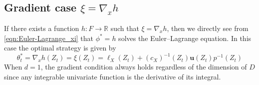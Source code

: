 \documentclass{article}
\theoremstyle{plain}
\theoremstyle{definition}
\newcommand{\R}{\mathbb{R}}
\numberwithin{lem}{section}
\begin{document}
\subsection{Gradient case \texorpdfstring{$\xi = \nabla_x h$}{}} \label{sec:gradient}
If there exists a function $h: F \to \R$ such that $\xi =\nabla_x h$, then we directly see from \eqref{eqn:Euler-Lagrange_xi} that $\phi^* = h$ solves the Euler--Lagrange equation. In this case the optimal strategy is given by
\begin{equation} \label{eqn:gradient_case}
    \theta^*_t = \nabla_x h(Z_t) =\xi(Z_t) = \ell_X(Z_t) + (c_X)^{-1}(Z_t)\mathbf{u}(Z_t)p^{-1}(Z_t)
\end{equation}
When $d=1$, the gradient condition always holds regardless of the dimension of $D$ since any integrable univariate function is the derivative of its integral.

\end{document}

